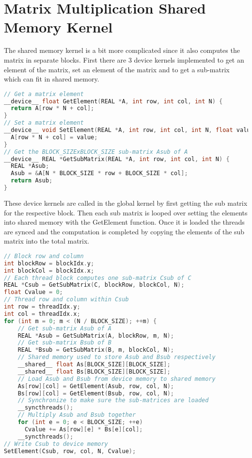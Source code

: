\documentclass[a4paper]{article}
\begin{document}
\section*{Matrix Multiplication Shared Memory Kernel}
The shared memory kernel is a bit more complicated since it also computes the matrix in separate blocks. First there are 3 device kernels implemented to get an element of the matrix, set an element of the matrix and to get a sub-matrix which can fit in shared memory.
\begin{lstlisting}[language=C++]
// Get a matrix element
__device__ float GetElement(REAL *A, int row, int col, int N) {
  return A[row * N + col];
}
// Set a matrix element
__device__ void SetElement(REAL *A, int row, int col, int N, float value) {
  A[row * N + col] = value;
}
// Get the BLOCK_SIZExBLOCK_SIZE sub-matrix Asub of A
__device__ REAL *GetSubMatrix(REAL *A, int row, int col, int N) {
  REAL *Asub;
  Asub = &A[N * BLOCK_SIZE * row + BLOCK_SIZE * col];
  return Asub;
}
\end{lstlisting}

These device kernels are called in the global kernel by first getting the sub matrix for the respective block. Then each sub matrix is looped over setting the elements into shared memory with the GetElement function. Once it is loaded the threads are synced and the computation is completed by copying the elements of the sub matrix into the total matrix.

\begin{lstlisting}[language=C++]
// Block row and column
int blockRow = blockIdx.y;
int blockCol = blockIdx.x;
// Each thread block computes one sub-matrix Csub of C
REAL *Csub = GetSubMatrix(C, blockRow, blockCol, N);
float Cvalue = 0;
// Thread row and column within Csub
int row = threadIdx.y;
int col = threadIdx.x;
for (int m = 0; m < (N / BLOCK_SIZE); ++m) {
	// Get sub-matrix Asub of A
    REAL *Asub = GetSubMatrix(A, blockRow, m, N);
    // Get sub-matrix Bsub of B
    REAL *Bsub = GetSubMatrix(B, m, blockCol, N);
    // Shared memory used to store Asub and Bsub respectively
    __shared__ float As[BLOCK_SIZE][BLOCK_SIZE];
    __shared__ float Bs[BLOCK_SIZE][BLOCK_SIZE];
    // Load Asub and Bsub from device memory to shared memory
    As[row][col] = GetElement(Asub, row, col, N);
    Bs[row][col] = GetElement(Bsub, row, col, N);
    // Synchronize to make sure the sub-matrices are loaded
    __syncthreads();
    // Multiply Asub and Bsub together
    for (int e = 0; e < BLOCK_SIZE; ++e)
      Cvalue += As[row][e] * Bs[e][col];
    __syncthreads();
// Write Csub to device memory
SetElement(Csub, row, col, N, Cvalue);
\end{lstlisting}
\end{document}
